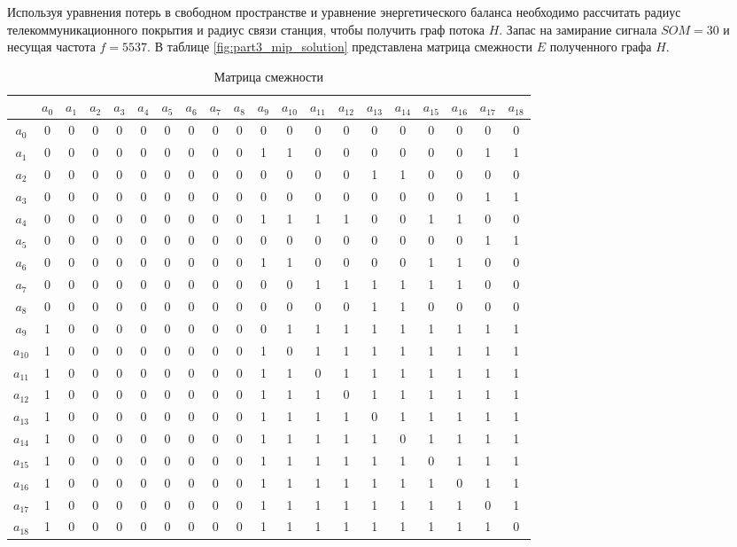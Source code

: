 Используя уравнения потерь в свободном пространстве и уравнение энергетического баланса необходимо рассчитать радиус телекоммуникационного покрытия и радиус связи станция, чтобы получить граф потока $H$. Запас на замирание сигнала $SOM = 30$ и несущая частота $f=5537$. В таблице \cref{fig:part3_mip_solution} представлена матрица смежности $E$ полученного графа $H$.


\begin{table}[hbt!]
    \tiny
    \begin{tabular}{| c|| c| c c c c c c c c| c c c c c c c c c c|}

    \hline

    &$a_0$ &$a_1$ &$a_2$ &$a_3$ &$a_4$ &$a_5$ &$a_6$ &$a_7$ &$a_8$ &$a_9$& $a_{10}$&$a_{11}$&$a_{12}$& $a_{13}$& $a_{14}$& $a_{15}$& $a_{16}$& $a_{17}$& $a_{18}$  \\
    \hline \hline
    $a_0$ & 0 &0 &0 &0 &0 &0 &0 &0 &0 &0 &0 &0 &0 &0 &0 &0 &0 &0 &0  \\
    \hline
    $a_1$ & 0 &0 &0 &0 &0 &0 &0 &0 &0 &1 &1 &0 &0 &0 &0 &0 &0 &1 &1  \\
    $a_2$ & 0 &0 &0 &0 &0 &0 &0 &0 &0 &0 &0 &0 &0 &1 &1 &0 &0 &0 &0  \\
    $a_3$ & 0 &0 &0 &0 &0 &0 &0 &0 &0 &0 &0 &0 &0 &0 &0 &0 &0 &1 &1  \\
    $a_4$ & 0 &0 &0 &0 &0 &0 &0 &0 &0 &1 &1 &1 &1 &0 &0 &1 &1 &0 &0  \\
    $a_5$ & 0 &0 &0 &0 &0 &0 &0 &0 &0 &0 &0 &0 &0 &0 &0 &0 &0 &1 &1  \\
    $a_6$ & 0 &0 &0 &0 &0 &0 &0 &0 &0 &1 &1 &0 &0 &0 &0 &1 &1 &0 &0  \\
    $a_7$ & 0 &0 &0 &0 &0 &0 &0 &0 &0 &0 &0 &1 &1 &1 &1 &1 &1 &0 &0  \\
    $a_8$ & 0 &0 &0 &0 &0 &0 &0 &0 &0 &0 &0 &0 &0 &1 &1 &0 &0 &0 &0  \\
    \hline
    $a_9$ & 1 &0 &0 &0 &0 &0 &0 &0 &0 &0 &1 &1 &1 &1 &1 &1 &1 &1 &1  \\
    $a_{10}$ & 1 &0 &0 &0 &0 &0 &0 &0 &0 &1 &0 &1 &1 &1 &1 &1 &1 &1 &1  \\
    $a_{11}$ & 1 &0 &0 &0 &0 &0 &0 &0 &0 &1 &1 &0 &1 &1 &1 &1 &1 &1 &1  \\
    $a_{12}$ & 1 &0 &0 &0 &0 &0 &0 &0 &0 &1 &1 &1 &0 &1 &1 &1 &1 &1 &1  \\
    $a_{13}$ & 1 &0 &0 &0 &0 &0 &0 &0 &0 &1 &1 &1 &1 &0 &1 &1 &1 &1 &1  \\
    $a_{14}$ & 1 &0 &0 &0 &0 &0 &0 &0 &0 &1 &1 &1 &1 &1 &0 &1 &1 &1 &1  \\
    $a_{15}$ & 1 &0 &0 &0 &0 &0 &0 &0 &0 &1 &1 &1 &1 &1 &1 &0 &1 &1 &1  \\
    $a_{16}$ & 1 &0 &0 &0 &0 &0 &0 &0 &0 &1 &1 &1 &1 &1 &1 &1 &0 &1 &1  \\
    $a_{17}$ & 1 &0 &0 &0 &0 &0 &0 &0 &0 &1 &1 &1 &1 &1 &1 &1 &1 &0 &1  \\
    $a_{18}$ & 1 &0 &0 &0 &0 &0 &0 &0 &0 &1 &1 &1 &1 &1 &1 &1 &1 &1 &0  \\
    \hline
    \end{tabular}\caption{Матрица смежности}\label{tab:part3_mip_adj_mat}
\end{table}

